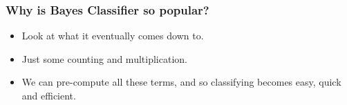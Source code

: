 


\begin{frame}[fragile]\frametitle{Why is Bayes Classifier so popular?}
\begin{itemize}
\item Look at what it eventually comes down to. 
\item Just some counting and multiplication.
\item We can pre-compute all these terms, and so classifying becomes easy, quick and efficient. 
\end{itemize}
\end{frame}


